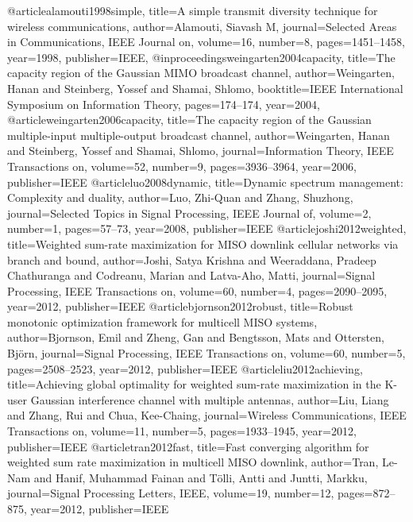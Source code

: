 \begin{thebibliography}{9}
	@article{alamouti1998simple,
		title={A simple transmit diversity technique for wireless communications},
		author={Alamouti, Siavash M},
		journal={Selected Areas in Communications, IEEE Journal on},
		volume={16},
		number={8},
		pages={1451--1458},
		year={1998},
		publisher={IEEE},
	}
	@inproceedings{weingarten2004capacity,
		title={The capacity region of the Gaussian MIMO broadcast channel},
		author={Weingarten, Hanan and Steinberg, Yossef and Shamai, Shlomo},
		booktitle={IEEE International Symposium on Information Theory},
		pages={174--174},
		year={2004},
	}
	@article{weingarten2006capacity,
		title={The capacity region of the Gaussian multiple-input multiple-output broadcast channel},
		author={Weingarten, Hanan and Steinberg, Yossef and Shamai, Shlomo},
		journal={Information Theory, IEEE Transactions on},
		volume={52},
		number={9},
		pages={3936--3964},
		year={2006},
		publisher={IEEE}
    }
	@article{luo2008dynamic,
		title={Dynamic spectrum management: Complexity and duality},
		author={Luo, Zhi-Quan and Zhang, Shuzhong},
		journal={Selected Topics in Signal Processing, IEEE Journal of},
		volume={2},
		number={1},
		pages={57--73},
		year={2008},
		publisher={IEEE}
	}
	@article{joshi2012weighted,
		title={Weighted sum-rate maximization for MISO downlink cellular networks via branch and bound},
		author={Joshi, Satya Krishna and Weeraddana, Pradeep Chathuranga and Codreanu, Marian and Latva-Aho, Matti},
		journal={Signal Processing, IEEE Transactions on},
		volume={60},
		number={4},
		pages={2090--2095},
		year={2012},
		publisher={IEEE}
	}
	@article{bjornson2012robust,
		title={Robust monotonic optimization framework for multicell MISO systems},
		author={Bjornson, Emil and Zheng, Gan and Bengtsson, Mats and Ottersten, Bj{\"o}rn},
		journal={Signal Processing, IEEE Transactions on},
		volume={60},
		number={5},
		pages={2508--2523},
		year={2012},
		publisher={IEEE}
	}
	@article{liu2012achieving,
		title={Achieving global optimality for weighted sum-rate maximization in the K-user Gaussian interference channel with multiple antennas},
		author={Liu, Liang and Zhang, Rui and Chua, Kee-Chaing},
		journal={Wireless Communications, IEEE Transactions on},
		volume={11},
		number={5},
		pages={1933--1945},
		year={2012},
		publisher={IEEE}
	}
	@article{tran2012fast,
		title={Fast converging algorithm for weighted sum rate maximization in multicell MISO downlink},
		author={Tran, Le-Nam and Hanif, Muhammad Fainan and T{\"o}lli, Antti and Juntti, Markku},
		journal={Signal Processing Letters, IEEE},
		volume={19},
		number={12},
		pages={872--875},
		year={2012},
		publisher={IEEE}
	}
	

\end{thebibliography}
